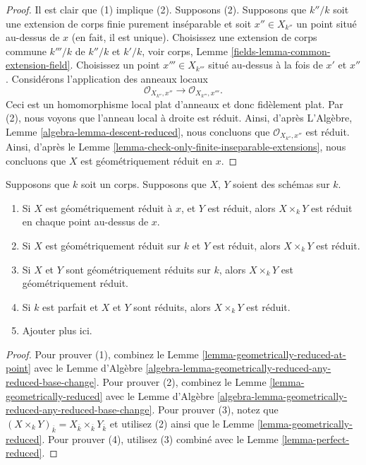 \begin{proof}
Il est clair que (1) implique (2). Supposons (2). Supposons que
$k''/k$ soit une extension de corps finie purement inséparable et
soit $x'' \in X_{k''}$ un point situé au-dessus de $x$ (en fait, il
est unique). Choisissez une extension de corps commune $k'''/k$ de
$k''/k$ et $k'/k$, voir corps, Lemme
\ref{fields-lemma-common-extension-field}. Choisissez un point $x''' \in X_{k'''}$
situé au-dessus à la fois de $x'$ et $x''$. Considérons l'application des anneaux locaux
$$
\mathcal{O}_{X_{k''}, x''} \longrightarrow \mathcal{O}_{X_{k'''}, x'''}.
$$
Ceci est un homomorphisme local plat d'anneaux et donc fidèlement
plat. Par (2), nous voyons que l'anneau local à droite est réduit.
Ainsi, d'après L'Algèbre, Lemme
\ref{algebra-lemma-descent-reduced}, nous concluons que
$\mathcal{O}_{X_{k''}, x''}$ est réduit. Ainsi, d'après le Lemme
\ref{lemma-check-only-finite-inseparable-extensions}, nous concluons que $X$ est géométriquement réduit en $x$.
\end{proof}

\begin{lemma}
\label{lemma-geometrically-reduced-any-base-change}
Supposons que $k$ soit un corps. Supposons que $X$, $Y$ soient des schémas sur $k$.
\begin{enumerate}
\item Si $X$ est géométriquement réduit à $x$, et
$Y$ est réduit, alors $X \times_k Y$ est réduit
en chaque point au-dessus de $x$. \item Si $X$ est
géométriquement réduit sur $k$ et $Y$ est réduit,
alors $X \times_k Y$ est réduit. \item Si $X$ et
$Y$ sont géométriquement réduits sur $k$, alors $X
\times_k Y$ est géométriquement réduit. \item Si
$k$ est parfait et $X$ et $Y$ sont réduits, alors
$X \times_k Y$ est réduit. \item Ajouter plus ici.
\end{enumerate}
\end{lemma}

\begin{proof}
Pour prouver (1), combinez le Lemme
\ref{lemma-geometrically-reduced-at-point} avec le Lemme
d'Algèbre
\ref{algebra-lemma-geometrically-reduced-any-reduced-base-change}.
Pour prouver (2), combinez le Lemme
\ref{lemma-geometrically-reduced} avec le Lemme d'Algèbre
\ref{algebra-lemma-geometrically-reduced-any-reduced-base-change}.
Pour prouver (3), notez que $(X \times_k Y)_{\overline{k}} =
X_{\overline{k}} \times_{\overline{k}} Y_{\overline{k}}$ et utilisez
(2) ainsi que le Lemme \ref{lemma-geometrically-reduced}. Pour prouver
(4), utilisez (3) combiné avec le Lemme \ref{lemma-perfect-reduced}.
\end{proof}

